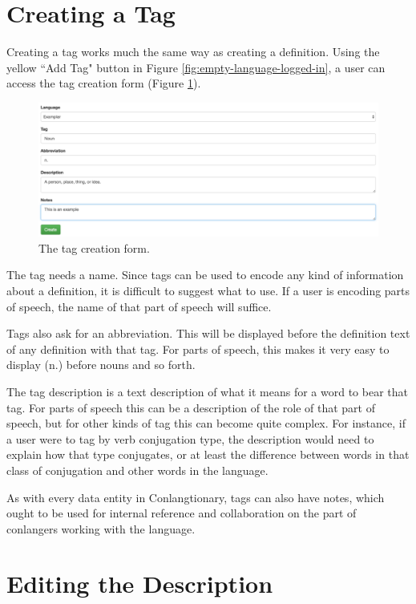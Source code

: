 \section{Creating a Tag}
\label{sec:create-tag}

Creating a tag works much the same way as creating a definition. Using the yellow ``Add Tag" button in Figure \ref{fig:empty-language-logged-in}, a user can access the tag creation form (Figure \ref{fig:create-tag}). 

\begin{figure}[h]
\includegraphics[width=\textwidth]{figures/create-tag}
\caption{The tag creation form.}
\centering
\label{fig:create-tag}
\end{figure}

The tag needs a name. Since tags can be used to encode any kind of information about a definition, it is difficult to suggest what to use. If a user is encoding parts of speech, the name of that part of speech will suffice. 

Tags also ask for an abbreviation. This will be displayed before the definition text of any definition with that tag. For parts of speech, this makes it very easy to display (n.) before nouns and so forth.

The tag description is a text description of what it means for a word to bear that tag. For parts of speech this can be a description of the role of that part of speech, but for other kinds of tag this can become quite complex. For instance, if a user were to tag by verb conjugation type, the description would need to explain how that type conjugates, or at least the difference between words in that class of conjugation and other words in the language.

As with every data entity in Conlangtionary, tags can also have notes, which ought to be used for internal reference and collaboration on the part of conlangers working with the language.

\section{Editing the Description}
\label{sec:edit-description}

